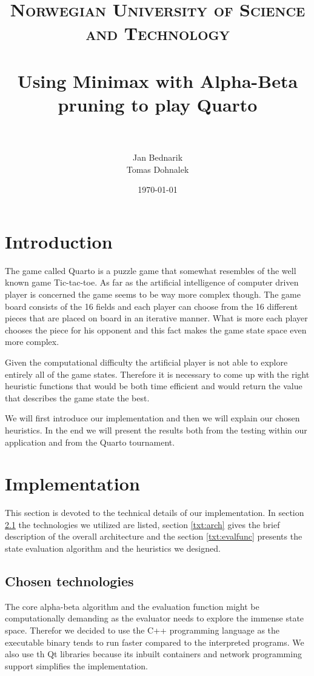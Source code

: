 \documentclass[paper=a4, fontsize=11pt]{article} %
\title{	
\normalfont \normalsize 
\textsc{Norwegian University of Science and Technology} \\ [25pt] %
\horrule{0.5pt} \\[0.4cm] %
\huge Using Minimax with Alpha-Beta pruning to play Quarto\\ %
\horrule{2pt} \\[0.5cm] %
}
\author{Jan Bednarik\\Tomas Dohnalek} %
\date{\normalsize\today} %
\begin{document}
\maketitle %

\section{Introduction}


The game called Quarto is a puzzle game that somewhat resembles of the well known game Tic-tac-toe. As far as the artificial intelligence of computer driven player is concerned the game seems to be way more complex though. The game board consists of the 16 fields and each player can choose from the 16 different pieces that are placed on board in an iterative manner. What is more each player chooses the piece for his opponent and this fact makes the game state space even more complex.

Given the computational difficulty the artificial player is not able to explore entirely all of the game states. Therefore it is necessary to come up with the right heuristic functions that would be both time efficient and would return the value that describes the game state the best.

We will first introduce our implementation and then we will explain our chosen heuristics. In the end we will present the results both from the testing within our application and from the Quarto tournament.

\section{Implementation}
This section is devoted to the technical details of our implementation. In section \ref{txt:tech} the technologies we utilized are listed, section \ref{txt:arch} gives the brief description of the overall architecture and the section \ref{txt:evalfunc} presents the state evaluation algorithm and the heuristics we designed.

\subsection{Chosen technologies} \label{txt:tech}
The core alpha-beta algorithm and the evaluation function might be computationally demanding as the evaluator needs to explore the immense state space. Therefor we decided to use the C++ programming language as the executable binary tends to run faster compared to the interpreted programs. We also use th Qt libraries because its inbuilt containers and network programming support simplifies the implementation.
\end{document}
